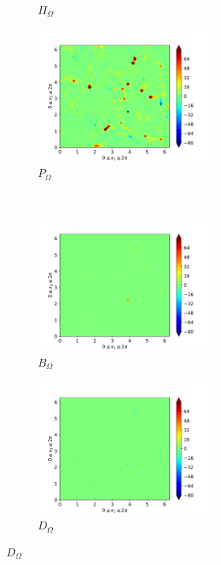 \begin{figure}[H]
\begin{subfigure}{0.45\textwidth}
        \caption{$\Pi_{\Omega}$}
    \end{subfigure}
    \newline
    \begin{subfigure}{0.45\textwidth}
        \includegraphics[height=1.75in]{media/run-cds-65/P-enst-1340}
        \caption{$P_{\Omega}$}
    \end{subfigure}
    ~
    \begin{subfigure}{0.45\textwidth}
        \includegraphics[height=1.75in]{media/run-cds-65/B-enst-1340}
        \caption{$B_{\Omega}$}
    \end{subfigure}
    \newline
    \begin{subfigure}{0.45\textwidth}
        \includegraphics[height=1.75in]{media/run-cds-65/D-enst-1340}
        \caption{$D_{\Omega}$}
    \end{subfigure}
\end{figure}

\newpage

